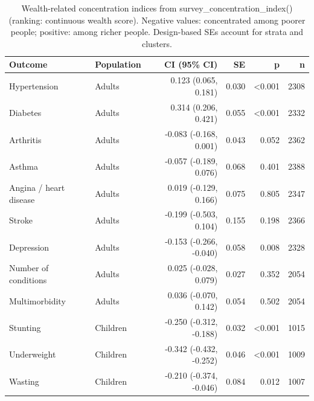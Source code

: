 \begin{table}

\caption{\label{tab:tab_concentration_indices}Wealth-related concentration indices from survey\_concentration\_index() (ranking: continuous wealth score). Negative values: concentrated among poorer people; positive: among richer people. Design-based SEs account for strata and clusters.}
\centering
\begin{tabular}[t]{llrrrr}
\toprule
Outcome & Population & CI (95\% CI) & SE & p & n\\
\midrule
Hypertension & Adults & 0.123 (0.065, 0.181) & 0.030 & <0.001 & 2308\\
Diabetes & Adults & 0.314 (0.206, 0.421) & 0.055 & <0.001 & 2332\\
Arthritis & Adults & -0.083 (-0.168, 0.001) & 0.043 & 0.052 & 2362\\
Asthma & Adults & -0.057 (-0.189, 0.076) & 0.068 & 0.401 & 2388\\
Angina / heart disease & Adults & 0.019 (-0.129, 0.166) & 0.075 & 0.805 & 2347\\
Stroke & Adults & -0.199 (-0.503, 0.104) & 0.155 & 0.198 & 2366\\
Depression & Adults & -0.153 (-0.266, -0.040) & 0.058 & 0.008 & 2328\\
Number of conditions & Adults & 0.025 (-0.028, 0.079) & 0.027 & 0.352 & 2054\\
Multimorbidity & Adults & 0.036 (-0.070, 0.142) & 0.054 & 0.502 & 2054\\
Stunting & Children & -0.250 (-0.312, -0.188) & 0.032 & <0.001 & 1015\\
Underweight & Children & -0.342 (-0.432, -0.252) & 0.046 & <0.001 & 1009\\
Wasting & Children & -0.210 (-0.374, -0.046) & 0.084 & 0.012 & 1007\\
\bottomrule
\end{tabular}
\end{table}

